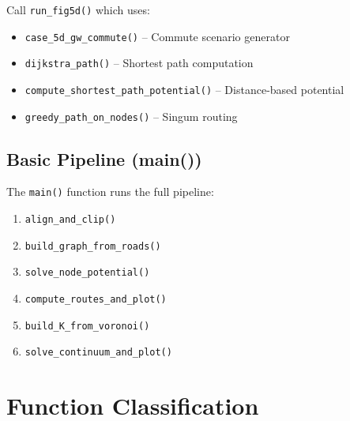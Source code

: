 \documentclass[11pt]{article}
\begin{document}
Call \texttt{run\_fig5d()} which uses:
\begin{itemize}[noitemsep]
    \item \texttt{case\_5d\_gw\_commute()} -- Commute scenario generator
    \item \texttt{dijkstra\_path()} -- Shortest path computation
    \item \texttt{compute\_shortest\_path\_potential()} -- Distance-based potential
    \item \texttt{greedy\_path\_on\_nodes()} -- Singum routing
\end{itemize}

\subsection{Basic Pipeline (main())}

The \texttt{main()} function runs the full pipeline:
\begin{enumerate}[noitemsep]
    \item \texttt{align\_and\_clip()}
    \item \texttt{build\_graph\_from\_roads()}
    \item \texttt{solve\_node\_potential()}
    \item \texttt{compute\_routes\_and\_plot()}
    \item \texttt{build\_K\_from\_voronoi()}
    \item \texttt{solve\_continuum\_and\_plot()}
\end{enumerate}

\section{Function Classification}
\end{document}
